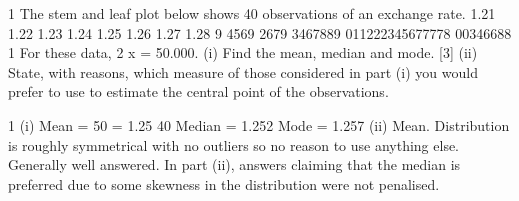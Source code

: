 \documentclass[a4paper,12pt]{article}
\begin{document}
1
The stem and leaf plot below shows 40 observations of an exchange rate.
1.21
1.22
1.23
1.24
1.25
1.26
1.27
1.28
9
4569
2679
3467889
011222345677778
00346688
1
For these data,
2
\sum  x = 50.000.
(i) Find the mean, median and mode.
[3]
(ii) State, with reasons, which measure of those considered in part (i) you would
prefer to use to estimate the central point of the observations.

1
(i)
Mean  =  50
 =  1.25
40
Median = 1.252
Mode = 1.257
(ii)
Mean. Distribution is roughly symmetrical with no outliers so no reason to use
anything else.
Generally well answered. In part (ii), answers claiming that the median is preferred due to
some skewness in the distribution were not penalised.
\end{document}
